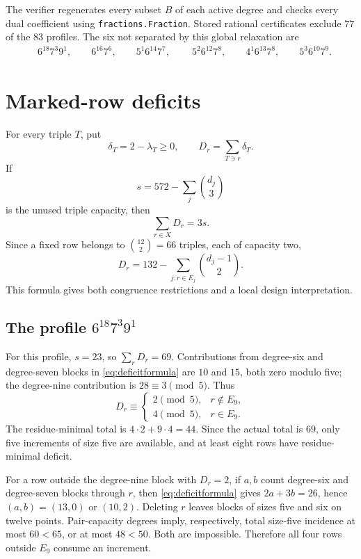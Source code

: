 \documentclass[11pt]{amsart}
\begin{document}
The verifier regenerates every subset $B$ of each active degree and checks every dual coefficient using \texttt{fractions.Fraction}. Stored rational certificates exclude $77$ of the $83$ profiles. The six not separated by this global relaxation are
\begin{equation}\label{eq:sixprofiles}
\begin{split}
&6^{18}7^3 9^1,\qquad 6^{16}7^6,\qquad 5^1 6^{14}7^7,\qquad\
5^2 6^{12}7^8,\qquad 4^1 6^{13}7^8,\qquad 5^3 6^{10}7^9.
\end{split}
\end{equation}

\section{Marked-row deficits}
For every triple $T$, put
\[
  \delta_T=2-\lambda_T\ge0,
  \qquad
  D_r=\sum_{T\ni r}\delta_T.
\]
If
\[
 s=572-\sum_j\binom{d_j}{3}
\]
is the unused triple capacity, then
\begin{equation}\label{eq:deficitsum}
  \sum_{r\in X}D_r=3s.
\end{equation}
Since a fixed row belongs to $\binom{12}{2}=66$ triples, each of capacity two,
\begin{equation}\label{eq:deficitformula}
  D_r=132-\sum_{j:r\in E_j}\binom{d_j-1}{2}.
\end{equation}
This formula gives both congruence restrictions and a local design interpretation.

\subsection{The profile $6^{18}7^3 9^1$}
For this profile, $s=23$, so $\sum_rD_r=69$. Contributions from degree-six and degree-seven blocks in \eqref{eq:deficitformula} are $10$ and $15$, both zero modulo five; the degree-nine contribution is $28\equiv3\pmod5$. Thus
\[
 D_r\equiv
 \begin{cases}
 2\pmod5,&r\notin E_9,\\
 4\pmod5,&r\in E_9.
 \end{cases}
\]
The residue-minimal total is $4\cdot2+9\cdot4=44$. Since the actual total is $69$, only five increments of size five are available, and at least eight rows have residue-minimal deficit.

For a row outside the degree-nine block with $D_r=2$, if $a,b$ count degree-six and degree-seven blocks through $r$, then \eqref{eq:deficitformula} gives $2a+3b=26$, hence $(a,b)=(13,0)$ or $(10,2)$. Deleting $r$ leaves blocks of sizes five and six on twelve points. Pair-capacity degrees imply, respectively, total size-five incidence at most $60<65$, or at most $48<50$. Both are impossible. Therefore all four rows outside $E_9$ consume an increment.
\end{document}
